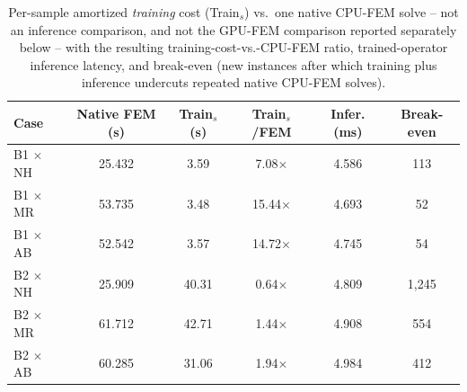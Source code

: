 \documentclass[final,5p,times]{elsarticle}
\begin{document}
\begin{table}[ht]
\centering
\caption{Per-sample amortized \emph{training} cost (Train$_s$) vs.\ one
  native CPU-FEM solve -- not an inference comparison, and not the
  GPU-FEM comparison reported separately below -- with the resulting
  training-cost-vs.-CPU-FEM ratio, trained-operator inference latency,
  and break-even (new instances after which training plus inference
  undercuts repeated native CPU-FEM solves).}
\label{tab:cost}
\small
\begin{tabular}{lccccc}
\toprule
Case & Native FEM (s) & Train$_s$ (s) & Train$_s$/FEM & Infer. (ms) & Break-even \\
\midrule
B1 $\times$ NH  & 25.432 & 3.59  & 7.08$\times$  & 4.586 & 113 \\
B1 $\times$ MR  & 53.735 & 3.48  & 15.44$\times$ & 4.693 & 52 \\
B1 $\times$ AB  & 52.542 & 3.57  & 14.72$\times$ & 4.745 & 54 \\
B2 $\times$ NH  & 25.909 & 40.31 & 0.64$\times$  & 4.809 & 1{,}245 \\
B2 $\times$ MR  & 61.712 & 42.71 & 1.44$\times$  & 4.908 & 554 \\
B2 $\times$ AB  & 60.285 & 31.06 & 1.94$\times$  & 4.984 & 412 \\
\bottomrule
\end{tabular}
\end{table}
\end{document}
